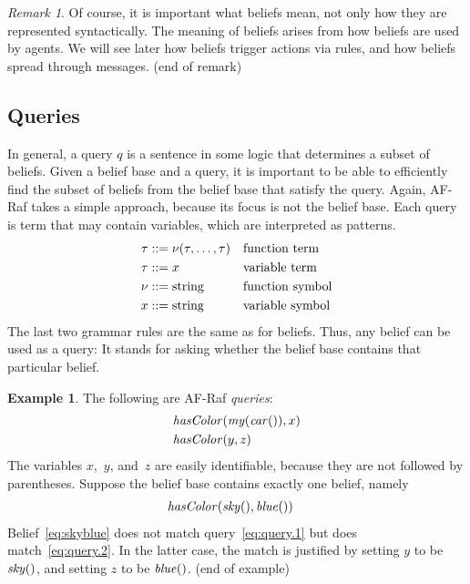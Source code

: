 \documentclass[a4paper,12pt,oneside,fleqn]{book} %
\theoremstyle{plain}
\theoremstyle{definition}
\newtheorem{example}{Example}
\theoremstyle{remark}
\newtheorem{remark}{Remark}
\newcommand{\eox}[1]{\hskip5mm\null\nobreak\hfill#1}
\newcommand{\eoe}{\eox{(end of example)}}
\newcommand{\eor}{\eox{(end of remark)}}
\begin{document}
\begin{remark} Of course, it is important what beliefs mean, not only how
they are represented syntactically.  The meaning of beliefs arises from how
beliefs are used by agents.  We will see later how beliefs trigger actions
via rules, and how beliefs spread through messages.  \eor \end{remark}

\subsection{Queries}

In general, a query $q$ is a sentence in some logic that determines a
subset of beliefs.  Given a belief base and a query, it is important to be
able to efficiently find the subset of beliefs from the belief base that
satisfy the query.  Again, AF-Raf takes a simple approach, because its
focus is not the belief base.  Each query is term that may contain
variables, which are interpreted as patterns.  \begin{align} \tau &::=
\nu(\tau,\ldots,\tau) && \text{function term} \\ \tau &::= x &&
\text{variable term} \\ \nu  &::= {\rm string} &&\text{function symbol} \\
x &::= {\rm string} && \text{variable symbol} \end{align} The last two
grammar rules are the same as for beliefs.  Thus, any belief can be used as
a query:  It stands for asking whether the belief base contains that
particular belief.

\begin{example} The following are AF-Raf \emph{queries}: \begin{align}
&{\it hasColor}({\it my}({\it car}()), x) \label{eq:query.1} \\ &{\it
hasColor}(y, z) \label{eq:query.2} \end{align} The variables $x$,~$y$,
and~$z$ are easily identifiable, because they are not followed by
parentheses.  Suppose the belief base contains exactly one belief, namely
\begin{align} &{\it hasColor}({\it sky}(), {\it blue}()) \label{eq:skyblue}
\end{align} Belief~\eqref{eq:skyblue} does not match
query~\eqref{eq:query.1} but does match~\eqref{eq:query.2}.  In the latter
case, the match is justified by setting $y$ to be ${\it sky}()$, and
setting $z$ to be ${\it blue}()$.  \eoe \end{example}
\end{document}
